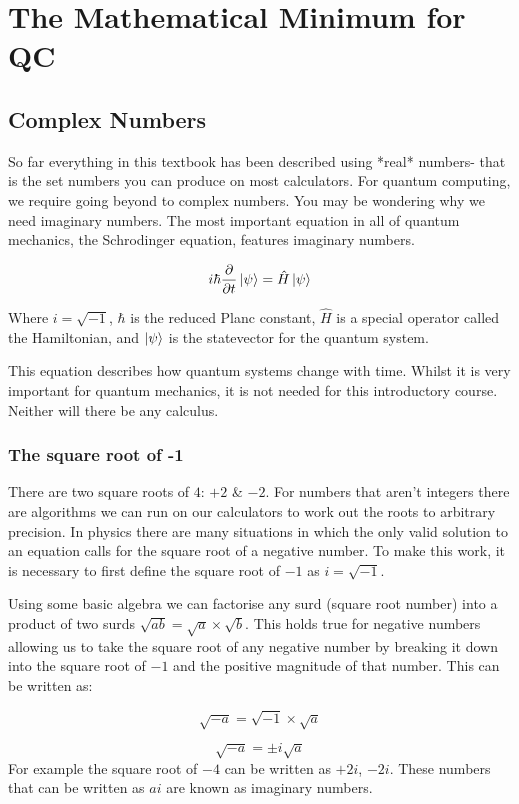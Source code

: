 \documentclass{book}
\begin{document}
\chapter{The Mathematical Minimum for QC}
\section{Complex Numbers}

So far everything in this textbook has been described using *real* numbers- that is the set numbers you can produce on most calculators. For quantum computing, we require going beyond to complex numbers. You may be wondering why we need imaginary numbers. The most important equation in all of quantum mechanics, the Schrodinger equation, features imaginary numbers. 

$$ i\hbar \frac{\partial{}}{\partial{t}}\ket{\psi} = \hat{H}\ket{\psi} $$

Where $i = \sqrt{-1}$, $\hbar$ is the reduced Planc constant, $\hat{H}$ is a special operator called the Hamiltonian, and $\ket{\psi}$ is the statevector for the quantum system. 

This equation describes how quantum systems change with time. Whilst it is very important for quantum mechanics, it is not needed for this introductory course. Neither will there be any calculus.

\subsection{ The square root of -1}

There are two square roots of $4$: $+2$ \& $-2$. For numbers that aren't integers there are algorithms we can run on our calculators to work out the roots to arbitrary precision. In physics there are many situations in which the only valid solution to an equation calls for the square root of a negative number. To make this work, it is necessary to first define the square root of $-1$ as $i = \sqrt{-1}$. 

Using some basic algebra we can factorise any surd (square root number) into a product of two surds $ \sqrt{ab} = \sqrt{a} \times \sqrt{b}$. This holds true for negative numbers allowing us to take the square root of any negative number by breaking it down into the square root of $-1$ and the positive magnitude of that number. This can be written as:

$$ \sqrt{-a} = \sqrt{-1} \times \sqrt{a} $$

$$ \sqrt{-a} = \pm i \sqrt{a} $$
For example the square root of $-4$ can be written as $+2i$, $-2i$.
These numbers that can be written as $ai$ are known as imaginary numbers. 
\end{document}
